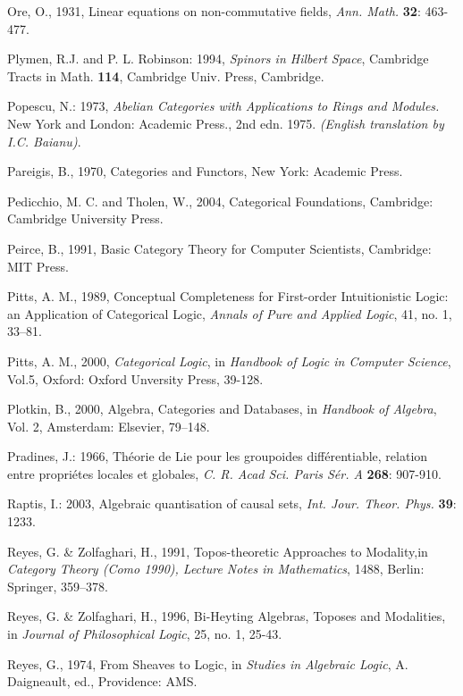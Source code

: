 \documentclass[12pt]{article}
\theoremstyle{plain}
\theoremstyle{definition}
\numberwithin{equation}{section}
\begin{document}
\begin{thebibliography}{199}
Ore, O., 1931, Linear equations on non-commutative fields, {\em Ann. Math.} \textbf{32}: 463-477.

Plymen, R.J. and P. L. Robinson: 1994,  \emph{Spinors in Hilbert Space}, Cambridge Tracts in Math. 
\textbf{114}, Cambridge Univ. Press, Cambridge.

Popescu, N.: 1973, \emph{Abelian Categories with Applications to Rings and Modules.} New York and London: Academic Press., 2nd edn. 1975. \emph{(English translation by I.C. Baianu)}.

Pareigis, B., 1970, Categories and Functors, New York: Academic Press. 

Pedicchio, M. C. and Tholen, W., 2004, Categorical Foundations, Cambridge: Cambridge University Press. 

Peirce, B., 1991, Basic Category Theory for Computer Scientists, Cambridge: MIT Press. 

Pitts, A. M., 1989, Conceptual Completeness for First-order Intuitionistic Logic: an Application of Categorical Logic,
{\em Annals of Pure and Applied Logic}, 41, no. 1, 33--81. 

Pitts, A. M., 2000, {\em Categorical Logic}, in {\em Handbook of Logic in Computer Science}, Vol.5, Oxford: Oxford Unversity Press, 39-128.

Plotkin, B., 2000, Algebra, Categories and Databases, in {\em Handbook of Algebra}, Vol. 2, Amsterdam: Elsevier, 79--148. 

Pradines, J.: 1966, Th\'eorie de Lie pour les groupoides diff\'erentiable, relation entre propri\'etes locales et globales, \emph{C. R. Acad Sci. Paris S\'er. A} \textbf{268}: 907-910.

Raptis, I.: 2003, Algebraic quantisation of causal sets, \emph{Int. Jour. Theor. Phys.} \textbf{39}: 1233.

Reyes, G. \& Zolfaghari, H., 1991, Topos-theoretic Approaches to Modality,in {\em Category Theory (Como 1990), Lecture Notes in Mathematics}, 1488, Berlin: Springer, 359--378. 

Reyes, G. \& Zolfaghari, H., 1996, Bi-Heyting Algebras, Toposes and Modalities, in {\em Journal of Philosophical Logic}, 25, no. 1, 25-43. 

Reyes, G., 1974, From Sheaves to Logic, in {\em Studies in Algebraic Logic}, A. Daigneault, ed., Providence: AMS. 


\end{thebibliography}
\end{document}
